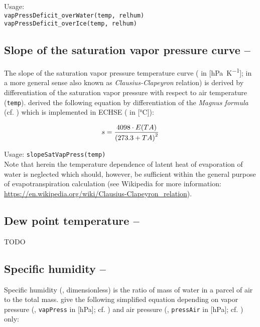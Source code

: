 \noindent
Usage:\\
\verb!vapPressDeficit_overWater(temp, relhum)!\\
\verb!vapPressDeficit_overIce(temp, relhum)!


\subsection{Slope of the saturation vapor pressure curve -- \slopeSatVapCurve} \label{sec:meteo:slopevappress}
The slope of the saturation vapor pressure temperature curve (\slopeSatVapCurve{} in [\si{\hecto\pascal\per\kelvin}]; in a more general sense also known as \emph{Clausius-Clapeyron} relation) is derived by differentiation of the saturation vapor pressure \satVaporPressure{} with respect to air temperature \airtemp{} (\verb!temp!). \citet{Dyck1995} derived the following equation by differentiation of the \emph{Magnus formula} (cf. ) which is implemented in ECHSE (\airtemp{} in [\si{\degreeCelsius}]):

\begin{equation} \label{eqn:meteo:slopeSatVapCurve}
s{} = \frac{4098 \cdot E{(TA{})}}{\left( 273.3 + TA{} \right)^2}
\end{equation}

\noindent
Usage:
\verb!slopeSatVapPress(temp)!\\

Note that herein the temperature dependence of latent heat of evaporation of water is neglected which should, however, be sufficient within the general purpose of evapotranspiration calculation (see Wikipedia for more information: \url{https://en.wikipedia.org/wiki/Clausius-Clapeyron_relation}).


\subsection{Dew point temperature -- \dewpointTemperature} \label{sec:meteo:dewtemp}

TODO


\subsection{Specific humidity -- \specHumidity} \label{sec:meteo:spechum}
Specific humidity (\specHumidity{}, dimensionless) is the ratio of mass of water in a parcel of air to the total mass. \citet{Dyck1995} give the following simplified equation depending on vapor pressure (\vaporPressure{}, \verb!vapPress! in [\si{\hecto\pascal}]; cf. ) and air pressure (\airPressure{}, \verb!pressAir! in [\si{\hecto\pascal}]; cf. ) only:

